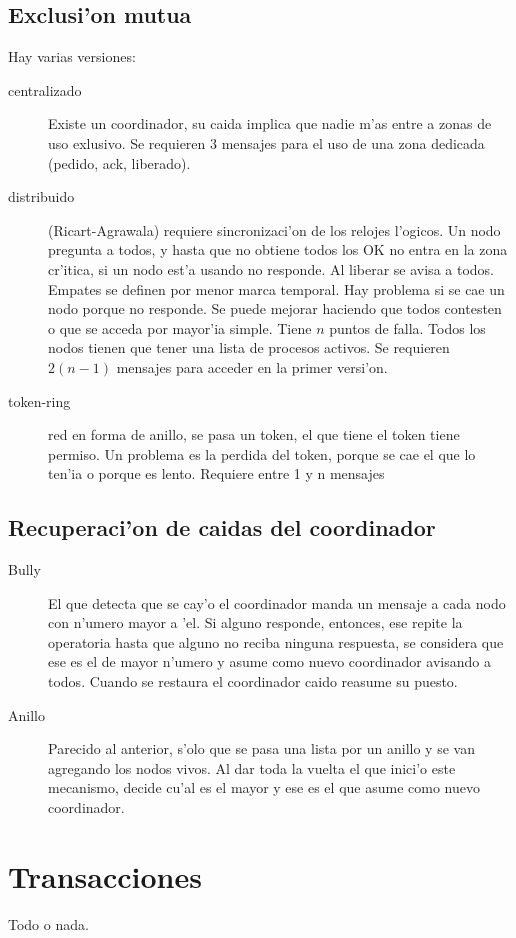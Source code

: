 \documentclass[a4paper,spanish]{article}
\begin{document}
\subsection{Exclusi'on mutua}
Hay varias versiones:
\begin{description}
	\item[centralizado] Existe un coordinador, su caida implica que nadie
m'as entre a zonas de uso exlusivo. Se requieren 3 mensajes para el uso de una
zona dedicada (pedido, ack, liberado).
	\item[distribuido] (Ricart-Agrawala) requiere sincronizaci'on de los
relojes l'ogicos. Un nodo pregunta a todos, y hasta que no obtiene todos los OK
no entra en la zona cr'itica, si un nodo est'a usando no responde. Al liberar
se avisa a todos. Empates se definen por menor marca temporal. Hay problema si
se cae un nodo porque no responde. Se puede mejorar haciendo que todos
contesten o que se acceda por mayor'ia simple. Tiene $n$ puntos de falla. Todos
los nodos tienen que tener una lista de procesos activos. Se requieren
$2(n-1)$ mensajes para acceder en la primer versi'on.
	\item[token-ring] red en forma de anillo, se pasa un token, el que
tiene el token tiene permiso. Un problema es la perdida del token, porque se
cae el que lo ten'ia o porque es lento. Requiere entre 1 y n mensajes
\end{description}

\subsection{Recuperaci'on de caidas del coordinador}
\begin{description}
	\item[Bully] El que detecta que se cay'o el coordinador manda un
mensaje a cada nodo con n'umero mayor a 'el. Si alguno responde, entonces, ese
repite la operatoria hasta que alguno no reciba ninguna respuesta, se considera
que ese es el de mayor n'umero y asume como nuevo coordinador avisando a todos.
Cuando se restaura el coordinador caido reasume su puesto.
	\item[Anillo] Parecido al anterior, s'olo que se pasa una lista por un
anillo y se van agregando los nodos vivos. Al dar toda la vuelta el que inici'o
este mecanismo, decide cu'al es el mayor y ese es el que asume como nuevo
coordinador.
\end{description}

\section{Transacciones}
Todo o nada. 
\end{document}
